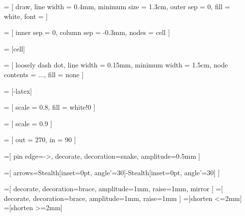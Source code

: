 \newcommand{\true}{\textcolor{green}{\ding{51}}}
\newcommand{\false}{\textcolor{red}{\ding{55}}}

 = [
  draw,
  line width = 0.4mm,
  minimum size = 1.3cm,
  outer sep = 0,
  fill = white,
  font = \large
]

 = [
  inner sep = 0,
  column sep = -0.3mm,
  nodes = cell
]

 = [cell]

 = [
  loosely dash dot,
  line width = 0.15mm,
  minimum width = 1.5cm,
  node contents = $\ldots$,
  fill = none
]

\newcommand{\ellipsis}{ \node [ellipsis]; }

 = [-latex]

 = [
  scale = 0.8,
  fill = white!0
]

 = [
  scale = 0.9
]

 = [
  out = 270,
  in = 90
]

=[
  pin edge={->, decorate, decoration={snake, amplitude=0.5mm}}
]

=[
  arrows={Stealth[inset=0pt, angle'=30]-Stealth[inset=0pt, angle'=30]}
]

\newcommand{\bottommeasure}[4][5mm] {
  \begin{scope}[line width = 0.1mm]
    \coordinate (x) at ([yshift = -#1] #3);
    \draw (x) [measure] -- node [label={[label distance=-1mm]above:#2}] {} (x -| #4);
    \draw (#3) -- ++(0, -#1) -- +(0, -1.25mm);
    \draw (#4) -- ++(0, -#1) -- +(0, -1.25mm);
  \end{scope}
}

=[
  decorate, decoration={brace, amplitude=1mm, raise=1mm, mirror}
]
=[
  decorate, decoration={brace, amplitude=1mm, raise=1mm}
]
=[shorten <=2mm]
=[shorten >=2mm]

\newcommand{\bracetobrace}[4] {
  \coordinate (a) at ([xshift=+0.1em, yshift=-0.5em] #1);
  \coordinate (b) at ([xshift=-0.1em, yshift=-0.5em] #2);
  \coordinate (c) at ([xshift=+0.1em, yshift=0.5em] #3);
  \coordinate (d) at ([xshift=-0.1em, yshift=0.5em] #4);
  \draw [bottombrace] (a) -- coordinate (e) (b);
  \draw [topbrace] (c) -- coordinate (f) (d);
  \draw [from brace, to brace, arrow] (e) -- (f);
}

